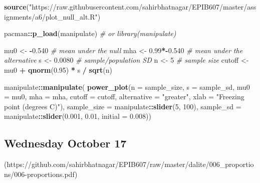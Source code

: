 \documentclass[]{book}
\makeatletter
\newenvironment{Shaded}{\begin{snugshade}}{\end{snugshade}}
\newcommand{\KeywordTok}[1]{\textcolor[rgb]{0.13,0.29,0.53}{\textbf{#1}}}
\newcommand{\DataTypeTok}[1]{\textcolor[rgb]{0.13,0.29,0.53}{#1}}
\newcommand{\DecValTok}[1]{\textcolor[rgb]{0.00,0.00,0.81}{#1}}
\newcommand{\FloatTok}[1]{\textcolor[rgb]{0.00,0.00,0.81}{#1}}
\newcommand{\StringTok}[1]{\textcolor[rgb]{0.31,0.60,0.02}{#1}}
\newcommand{\CommentTok}[1]{\textcolor[rgb]{0.56,0.35,0.01}{\textit{#1}}}
\newcommand{\OperatorTok}[1]{\textcolor[rgb]{0.81,0.36,0.00}{\textbf{#1}}}
\newcommand{\NormalTok}[1]{#1}
\let\originaltabular\tabular
\let\endoriginaltabular\endtabular
\renewenvironment{tabular}[1]{%
  \begingroup%
  \centering%
  \originaltabular{#1}}%
  {\endoriginaltabular\endgroup}
\newenvironment{kframe}{%
\medskip{}
\setlength{\fboxsep}{.8em}
 \def\at@end@of@kframe{}%
 \ifinner\ifhmode%
  \def\at@end@of@kframe{\end{minipage}}%
  \begin{minipage}{\columnwidth}%
 \fi\fi%
 \def\FrameCommand##1{\hskip\@totalleftmargin \hskip-\fboxsep
 \colorbox{shadecolor}{##1}\hskip-\fboxsep
     \hskip-\linewidth \hskip-\@totalleftmargin \hskip\columnwidth}%
 \MakeFramed {\advance\hsize-\width
   \@totalleftmargin\z@ \linewidth\hsize
   \@setminipage}}%
 {\par\unskip\endMakeFramed%
 \at@end@of@kframe}
\renewenvironment{Shaded}{\begin{kframe}}{\end{kframe}}
\theoremstyle{definition}
\theoremstyle{definition}
\theoremstyle{definition}
\theoremstyle{remark}
\makeatother
\begin{document}
\begin{Shaded}
\begin{Highlighting}[]
\KeywordTok{source}\NormalTok{(}\StringTok{"https://raw.githubusercontent.com/sahirbhatnagar/EPIB607/master/assignments/a6/plot_null_alt.R"}\NormalTok{)}

\NormalTok{pacman}\OperatorTok{::}\KeywordTok{p_load}\NormalTok{(manipulate) }\CommentTok{# or library(manipulate)}

\NormalTok{mu0 <-}\StringTok{ }\OperatorTok{-}\FloatTok{0.540} \CommentTok{# mean under the null}
\NormalTok{mha <-}\StringTok{ }\FloatTok{0.99}\OperatorTok{*-}\FloatTok{0.540} \CommentTok{# mean under the alternative}
\NormalTok{s <-}\StringTok{ }\FloatTok{0.0080} \CommentTok{# sample/population SD}
\NormalTok{n <-}\StringTok{ }\DecValTok{5} \CommentTok{# sample size}
\NormalTok{cutoff <-}\StringTok{ }\NormalTok{mu0 }\OperatorTok{+}\StringTok{ }\KeywordTok{qnorm}\NormalTok{(}\FloatTok{0.95}\NormalTok{) }\OperatorTok{*}\StringTok{ }\NormalTok{s }\OperatorTok{/}\StringTok{ }\KeywordTok{sqrt}\NormalTok{(n)}

\NormalTok{manipulate}\OperatorTok{::}\KeywordTok{manipulate}\NormalTok{(}
\KeywordTok{power_plot}\NormalTok{(}\DataTypeTok{n =}\NormalTok{ sample_size, }\DataTypeTok{s =}\NormalTok{ sample_sd,  }
    \DataTypeTok{mu0 =}\NormalTok{ mu0, }\DataTypeTok{mha =}\NormalTok{ mha, }
    \DataTypeTok{cutoff =}\NormalTok{ cutoff,}
    \DataTypeTok{alternative =} \StringTok{"greater"}\NormalTok{,}
    \DataTypeTok{xlab =} \StringTok{"Freezing point (degrees C)"}\NormalTok{),}
    \DataTypeTok{sample_size =}\NormalTok{ manipulate}\OperatorTok{::}\KeywordTok{slider}\NormalTok{(}\DecValTok{5}\NormalTok{, }\DecValTok{100}\NormalTok{),}
    \DataTypeTok{sample_sd =}\NormalTok{ manipulate}\OperatorTok{::}\KeywordTok{slider}\NormalTok{(}\FloatTok{0.001}\NormalTok{, }\FloatTok{0.01}\NormalTok{, }\DataTypeTok{initial =} \FloatTok{0.008}\NormalTok{))}
\end{Highlighting}
\end{Shaded}

\subsection{Wednesday October 17}\label{wednesday-october-17}

\begin{table}[H]
\centering
\begin{tabular}{l}
(https://github.com/sahirbhatnagar/EPIB607/raw/master/dalite/006\_proportions/006-proportions.pdf)\\
\hline
\end{tabular}
\end{table}
\end{document}
